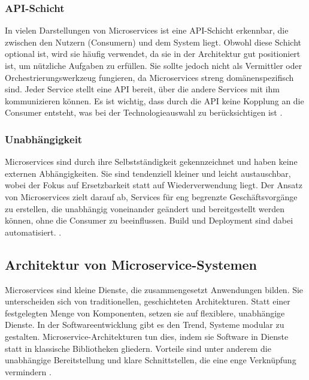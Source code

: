 {\subsubsection{API-Schicht}

In vielen Darstellungen von Microservices ist eine API-Schicht erkennbar, die zwischen den Nutzern (Consumern) und dem System liegt. Obwohl diese Schicht optional ist, wird sie häufig verwendet, da sie in der Architektur gut positioniert ist, um nützliche Aufgaben zu erfüllen. Sie sollte jedoch nicht als Vermittler oder Orchestrierungswerkzeug fungieren, da Microservices streng domänenspezifisch sind. Jeder Service stellt eine API bereit, über die andere Services mit ihm kommunizieren können. Es ist wichtig, dass durch die API keine Kopplung an die Consumer entsteht, was bei der Technologieauswahl zu berücksichtigen ist \cite[S.255,256]{richards} \cite[S.24]{newman}.

\subsubsection{Unabhängigkeit}

Microservices sind durch ihre Selbstständigkeit gekennzeichnet und haben keine externen Abhängigkeiten. Sie sind tendenziell kleiner und leicht austauschbar, wobei der Fokus auf Ersetzbarkeit statt auf Wiederverwendung liegt. Der Ansatz von Microservices zielt darauf ab, Services für eng begrenzte Geschäftsvorgänge zu erstellen, die unabhängig voneinander geändert und bereitgestellt werden können, ohne die Consumer zu beeinflussen. Build und Deployment sind dabei automatisiert. \cite[S. 2, 31-37]{wolff} \cite[S.22,23,28]{newman} \cite[S.154-157]{sommerville} \cite[S.128]{dowalil}.
 
\pagebreak
\subsection{Architektur von Microservice-Systemen}

Microservices sind kleine Dienste, die zusammengesetzt Anwendungen bilden. Sie unterscheiden sich von traditionellen, geschichteten Architekturen. Statt einer festgelegten Menge von Komponenten, setzen sie auf flexiblere, unabhängige Dienste. In der Softwareentwicklung gibt es den Trend, Systeme modular zu gestalten. Microservice-Architekturen tun dies, indem sie Software in Dienste statt in klassische Bibliotheken gliedern. Vorteile sind unter anderem die unabhängige Bereitstellung und klare Schnittstellen, die eine enge Verknüpfung vermindern \cite[S.154-157]{sommerville} \cite{fowlerlewis}.

}
